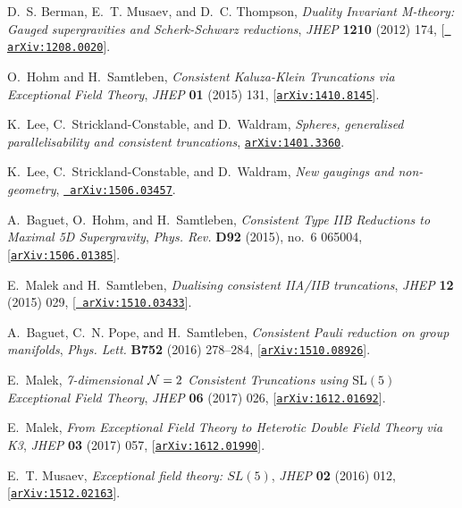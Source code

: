\documentclass{PoS}
\begin{document}
\begin{thebibliography}{99}
D.~S. Berman, E.~T. Musaev, and D.~C. Thompson, {\it {Duality Invariant
  M-theory: Gauged supergravities and Scherk-Schwarz reductions}},  {\em JHEP}
  {\bf 1210} (2012) 174, [\href{http://arxiv.org/abs/1208.0020}{{\tt
  arXiv:1208.0020}}].

O.~Hohm and H.~Samtleben, {\it {Consistent Kaluza-Klein Truncations via
  Exceptional Field Theory}},  {\em JHEP} {\bf 01} (2015) 131,
  [\href{http://arxiv.org/abs/1410.8145}{{\tt arXiv:1410.8145}}].

K.~Lee, C.~Strickland-Constable, and D.~Waldram, {\it {Spheres, generalised
  parallelisability and consistent truncations}},
  \href{http://arxiv.org/abs/1401.3360}{{\tt arXiv:1401.3360}}.

K.~Lee, C.~Strickland-Constable, and D.~Waldram, {\it {New gaugings and
  non-geometry}},  \href{http://arxiv.org/abs/1506.03457}{{\tt
  arXiv:1506.03457}}.

A.~Baguet, O.~Hohm, and H.~Samtleben, {\it {Consistent Type IIB Reductions to
  Maximal 5D Supergravity}},  {\em Phys. Rev.} {\bf D92} (2015), no.~6 065004,
  [\href{http://arxiv.org/abs/1506.01385}{{\tt arXiv:1506.01385}}].

E.~Malek and H.~Samtleben, {\it {Dualising consistent IIA/IIB truncations}},
  {\em JHEP} {\bf 12} (2015) 029, [\href{http://arxiv.org/abs/1510.03433}{{\tt
  arXiv:1510.03433}}].

A.~Baguet, C.~N. Pope, and H.~Samtleben, {\it {Consistent Pauli reduction on
  group manifolds}},  {\em Phys. Lett.} {\bf B752} (2016) 278--284,
  [\href{http://arxiv.org/abs/1510.08926}{{\tt arXiv:1510.08926}}].

E.~Malek, {\it {7-dimensional ${\cal N}=2$ Consistent Truncations using
  $\mathrm{SL}(5)$ Exceptional Field Theory}},  {\em JHEP} {\bf 06} (2017) 026,
  [\href{http://arxiv.org/abs/1612.01692}{{\tt arXiv:1612.01692}}].

E.~Malek, {\it {From Exceptional Field Theory to Heterotic Double Field Theory
  via K3}},  {\em JHEP} {\bf 03} (2017) 057,
  [\href{http://arxiv.org/abs/1612.01990}{{\tt arXiv:1612.01990}}].

E.~T. Musaev, {\it {Exceptional field theory: $SL(5)$}},  {\em JHEP} {\bf 02}
  (2016) 012, [\href{http://arxiv.org/abs/1512.02163}{{\tt arXiv:1512.02163}}].


\end{thebibliography}
\end{document}
